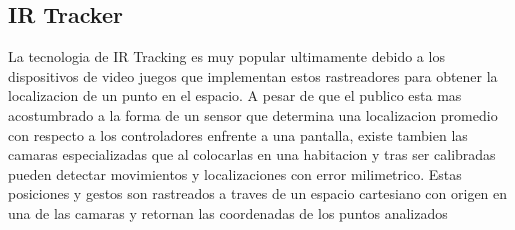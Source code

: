 \documentclass[11pt]{article} %
\begin{document}
\subsection{IR Tracker}
La tecnologia de IR Tracking es muy popular ultimamente debido a los dispositivos de video juegos que implementan estos rastreadores para obtener la localizacion de un punto en el espacio. A pesar de que el publico esta mas acostumbrado a la forma de un sensor que determina una localizacion promedio con respecto a los controladores enfrente a una pantalla, existe tambien las camaras especializadas que al colocarlas en una habitacion y tras ser calibradas pueden detectar movimientos y localizaciones con error milimetrico. Estas posiciones y gestos son rastreados a traves de un espacio cartesiano con origen en una de las camaras y retornan las coordenadas de los puntos analizados
\end{document}

